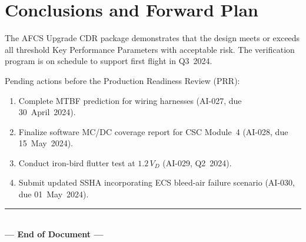 \chapter{Conclusions and Forward Plan}

The AFCS Upgrade CDR package demonstrates that the design meets or exceeds all
threshold Key Performance Parameters with acceptable risk. The verification
program is on schedule to support first flight in Q3~2024.

Pending actions before the Production Readiness Review (PRR):

\begin{enumerate}[label=\textbf{AI-\arabic*:}, leftmargin=*]
  \item Complete MTBF prediction for wiring harnesses (AI-027, due 30~April~2024).
  \item Finalize software MC/DC coverage report for CSC Module~4
        (AI-028, due 15~May~2024).
  \item Conduct iron-bird flutter test at $1.2\,V_D$ (AI-029, Q2~2024).
  \item Submit updated SSHA incorporating ECS bleed-air failure scenario
        (AI-030, due 01~May~2024).
\end{enumerate}

\vspace{14pt}

\vfill

\begin{center}
  \textcolor{rulegray}{\rule{0.5\textwidth}{0.3pt}}\\[6pt]
  {\footnotesize\bfseries\color{accent}--- End of Document ---}
\end{center}
